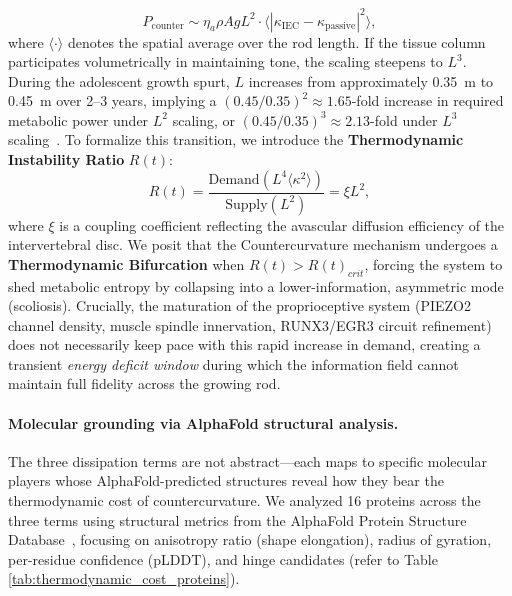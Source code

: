 \documentclass[11pt,a4paper]{article}
\newcommand{\InstabilityR}{R(t)}
\begin{document}
\begin{equation}
P_{\mathrm{counter}} \sim \eta_a \rho A g L^2 \cdot \langle |\kappa_{\mathrm{IEC}} - \kappa_{\mathrm{passive}}|^2 \rangle,
\label{eq:metabolic_scaling}
\end{equation}
where $\langle \cdot \rangle$ denotes the spatial average over the rod length. If the tissue column participates volumetrically in maintaining tone, the scaling steepens to $L^3$. During the adolescent growth spurt, $L$ increases from approximately 0.35~m to 0.45~m over 2--3 years, implying a $(0.45/0.35)^2 \approx 1.65$-fold increase in required metabolic power under $L^2$ scaling, or $(0.45/0.35)^3 \approx 2.13$-fold under $L^3$ scaling~\cite{rolfe1997cellular}. To formalize this transition, we introduce the \textbf{Thermodynamic Instability Ratio} $\InstabilityR$:
\begin{equation}
\InstabilityR = \frac{\text{Demand}(L^4 \langle \kappa^2 \rangle)}{\text{Supply}(L^2)} = \xi L^2,
\label{eq:instability_ratio}
\end{equation}
where $\xi$ is a coupling coefficient reflecting the avascular diffusion efficiency of the intervertebral disc. We posit that the Countercurvature mechanism undergoes a \textbf{Thermodynamic Bifurcation} when $\InstabilityR > \InstabilityR_{crit}$, forcing the system to shed metabolic entropy by collapsing into a lower-information, asymmetric mode (scoliosis). Crucially, the maturation of the proprioceptive system (PIEZO2 channel density, muscle spindle innervation, RUNX3/EGR3 circuit refinement) does not necessarily keep pace with this rapid increase in demand, creating a transient \emph{energy deficit window} during which the information field cannot maintain full fidelity across the growing rod.

\paragraph{Molecular grounding via AlphaFold structural analysis.} The three dissipation terms are not abstract---each maps to specific molecular players whose AlphaFold-predicted structures reveal how they bear the thermodynamic cost of countercurvature. We analyzed 16 proteins across the three terms using structural metrics from the AlphaFold Protein Structure Database~\cite{jumper2021alphafold, varadi2022alphafold}, focusing on anisotropy ratio (shape elongation), radius of gyration, per-residue confidence (pLDDT), and hinge candidates (refer to Table \ref{tab:thermodynamic_cost_proteins}).
\end{document}
